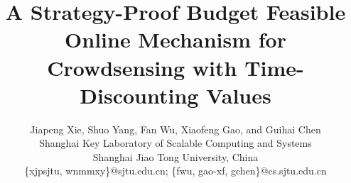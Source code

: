 \documentclass[conference,compsocconf,letterpaper,10pt]{IEEEtran}
\title{\huge{A Strategy-Proof Budget Feasible Online Mechanism for Crowdsensing with Time-Discounting Values}}
\author{
Jiapeng Xie, Shuo Yang, Fan Wu,  Xiaofeng Gao, and Guihai Chen\\
Shanghai Key Laboratory of Scalable Computing and Systems\\
Shanghai Jiao Tong University, China\\
\{xjpsjtu, wnmmxy\}@sjtu.edu.cn; \{fwu, gao-xf, gchen\}@cs.sjtu.edu.cn

}
\begin{document}
\maketitle

\begin{abstract}


\end{abstract}
\end{document}
